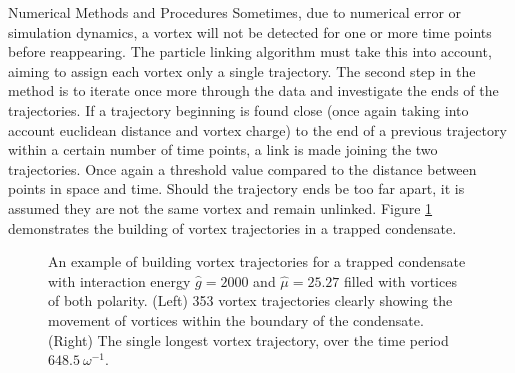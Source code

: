 \begin{chapter}{\label{cha:numerics}Numerical Methods and Procedures}
Sometimes, due to numerical error or simulation dynamics, a vortex will not be detected for one or more time points before reappearing. The particle linking algorithm must take this into account, aiming to assign each vortex only a single trajectory. The second step in the method is to iterate once more through the data and investigate the ends of the trajectories. If a trajectory beginning is found close (once again taking into account euclidean distance and vortex charge) to the end of a previous trajectory within a certain number of time points, a link is made joining the two trajectories. Once again a threshold value compared to the distance between points in space and time. Should the trajectory ends be too far apart, it is assumed they are not the same vortex and remain unlinked. Figure \ref{fig:vortextracks} demonstrates the building of vortex trajectories in a trapped condensate.
\begin{figure}[!ht]
\begin{center}
  \end{center}
  \caption{An example of building vortex trajectories for a trapped condensate with interaction energy $\hat{g}=2000$ and $\hat{\mu}=25.27$ filled with vortices of both polarity. (Left) 353 vortex trajectories clearly showing the movement of vortices within the boundary of the condensate. (Right) The single longest vortex trajectory, over the time period $648.5~\omega^{-1}$.\label{fig:vortextracks}}
\end{figure}



\end{chapter}
